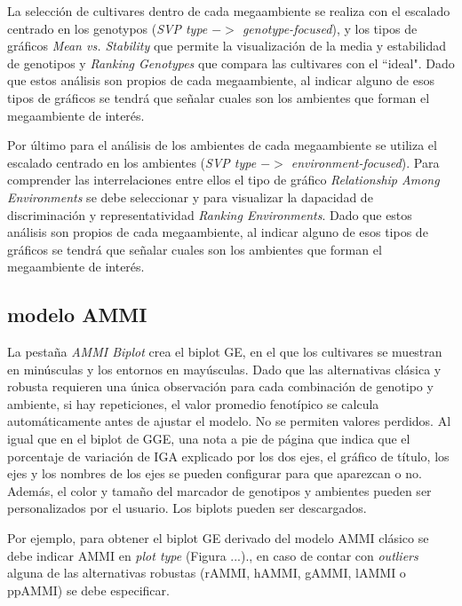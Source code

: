 La selección de cultivares dentro de cada megaambiente se realiza con el escalado centrado en los genotypos (\emph{SVP type $->$ genotype-focused}), y los tipos de gráficos 
\emph{Mean vs. Stability} que permite la visualización de la media y estabilidad de genotipos y \emph{Ranking Genotypes} que compara las cultivares con el ``ideal". Dado que estos análisis son propios de cada megaambiente, al indicar alguno de esos tipos de gráficos se tendrá que señalar cuales son los ambientes que forman el megaambiente de interés. 


Por último para el análisis de los ambientes de cada megaambiente se utiliza el escalado centrado en los ambientes (\emph{SVP type $->$ environment-focused}). Para comprender las interrelaciones entre ellos el tipo de gráfico \emph{Relationship Among Environments} se debe seleccionar y para visualizar la dapacidad de discriminación y representatividad 
\emph{Ranking Environments}. Dado que estos análisis son propios de cada megaambiente, al indicar alguno de esos tipos de gráficos se tendrá que señalar cuales son los ambientes que forman el megaambiente de interés. 


\subsection{modelo AMMI}

La pestaña \emph{AMMI Biplot} crea el biplot GE, en el que los cultivares se muestran en minúsculas y los entornos en mayúsculas. Dado que las alternativas clásica y robusta requieren una única observación para cada combinación de genotipo y ambiente, si hay repeticiones, el valor promedio fenotípico se calcula automáticamente antes de ajustar el modelo. No se permiten valores perdidos. Al igual que en el biplot de GGE, una nota a pie de página que indica que el porcentaje de variación de IGA explicado por los dos ejes, el gráfico de título, los ejes y los nombres de los ejes se pueden configurar para que aparezcan o no. Además, el color y tamaño del marcador de genotipos y ambientes pueden ser personalizados por el usuario. Los biplots pueden ser descargados.

Por ejemplo, para obtener el biplot GE derivado del modelo AMMI clásico se debe indicar
AMMI en \emph{plot type} (Figura ...)., en caso de contar con \emph{outliers} alguna de las alternativas robustas (rAMMI, hAMMI, gAMMI, lAMMI o ppAMMI) se debe especificar.
 


